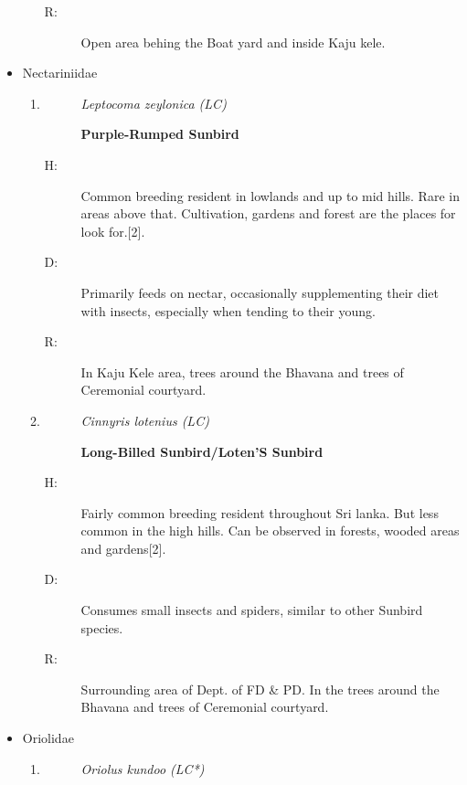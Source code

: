 \begin{itemize}
\begin{enumerate}
\begin{description}
\item[R: ]%
Open area behing the Boat yard and inside Kaju kele.%
\end{description}%
\end{enumerate}%
\item%
Nectariniidae%
\begin{enumerate}%
\item%
\begin{description}%
\item[]%
\textit{Leptocoma zeylonica (LC)}%
\item[]%
\textbf{Purple{-}Rumped Sunbird}%
\end{description}%
\begin{description}%
\item[H: ]%
Common breeding resident in lowlands and up to mid hills. Rare in areas above that. Cultivation, gardens and forest are the places for look for.{[}2{]}.%
\item[D: ]%
Primarily feeds on nectar, occasionally supplementing their diet with insects, especially when tending to their young.%
\item[R: ]%
In Kaju Kele area, trees around the Bhavana and trees of Ceremonial courtyard. %
\end{description}%
\item%
\begin{description}%
\item[]%
\textit{Cinnyris lotenius (LC)}%
\item[]%
\textbf{Long{-}Billed Sunbird/Loten'S Sunbird}%
\end{description}%
\begin{description}%
\item[H: ]%
Fairly common breeding resident throughout Sri lanka. But less common in the high hills. Can be observed in forests, wooded areas and gardens{[}2{]}.%
\item[D: ]%
Consumes small insects and spiders, similar to other Sunbird species.%
\item[R: ]%
Surrounding area of Dept. of FD \& PD. In the trees around the Bhavana and trees of Ceremonial courtyard.%
\end{description}%
\end{enumerate}%
\item%
Oriolidae%
\begin{enumerate}%
\item%
\begin{description}%
\item[]%
\textit{Oriolus kundoo (LC*)}%

\end{description}
\end{enumerate}
\end{itemize}
